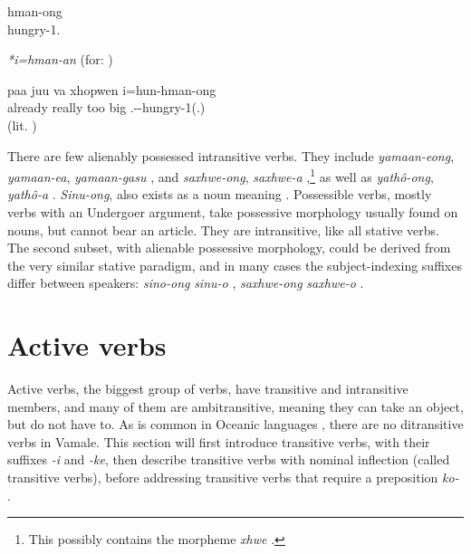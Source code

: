 	
	\ea\label{ex:hman1}
	\gll hman-ong\\
	 hungry-1.\\
	\glt {}
	\z
%	
%	
	
	 \ea\label{ex:hman3}
	     \textit{*i=hman-an} (for: )
	\z
	
	\ea\label{ex:xhopwen i}
	\gll paa juu va xhopwen i=hun-hman-ong\\
	 already really too big .--hungry-1(.)\\
	\glt {} (lit. )
\z
	


There are few alienably possessed intransitive verbs. They include \textit{yamaan-eong}, \textit{yamaan-ea}, \textit{yamaan-gasu} , and \textit{saxhwe-ong}, \textit{saxhwe-a} ,\footnote{This possibly contains the morpheme \textit{xhwe} .} as well as \textit{yathô-ong}, \textit{yathô-a} . \textit{Sinu-ong},  also exists as a noun meaning . %
Possessible verbs, mostly verbs with an Undergoer argument, take possessive morphology usually found on nouns, but cannot bear an article. They are intransitive, like all stative verbs. The second subset, with alienable possessive morphology, could be derived from the very similar stative paradigm, and in many cases the subject-indexing suffixes differ between speakers: \textit{sino-ong} \goodtilde \textit{sinu-o} , \textit{saxhwe-ong} \goodtilde \textit{saxhwe-o} .

 \section{Active verbs}
 \label{sec:ActV}
Active verbs, the biggest group of verbs, have transitive and intransitive members, and many of them are ambitransitive, meaning they can take an object, but do not have to. As is common in Oceanic languages \parencite[510]{ross_morphosyntactic_2004}, there are no ditransitive verbs in Vamale. This section will first introduce transitive verbs, with their suffixes \textit{-i} and \textit{-ke}, then describe transitive verbs with nominal inflection (called  transitive verbs), before addressing transitive verbs that require a preposition \textit{ko-} .

